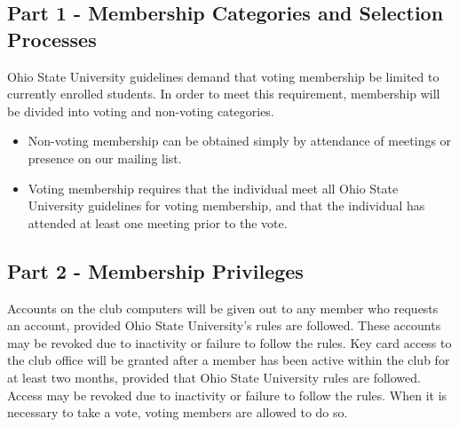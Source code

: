 \documentclass{article}
\begin{document}


	\subsection{Part 1 - Membership Categories and Selection Processes} Ohio
	State University guidelines demand that voting membership be limited to
	currently enrolled students.  In order to meet this requirement, membership
	will be divided into voting and non-voting categories.

	\begin{itemize} \item Non-voting membership can be obtained simply by
			attendance of meetings or presence on our mailing list.  \item
				Voting membership requires that the individual meet all Ohio
				State University guidelines for voting membership, and that the
		individual has attended at least one meeting prior to the vote.
\end{itemize} \subsection{Part 2 - Membership Privileges}

	Accounts on the club computers will be given out to any member who requests
	an account, provided Ohio State University's rules are followed.  These
	accounts may be revoked due to inactivity or failure to follow the rules.
	Key card access to the club office will be granted after a member has been
	active within the club for at least two months, provided that Ohio State
	University rules are followed.  Access may be revoked due to inactivity or
	failure to follow the rules.  When it is necessary to take a vote, voting
	members are allowed to do so.
\end{document}
